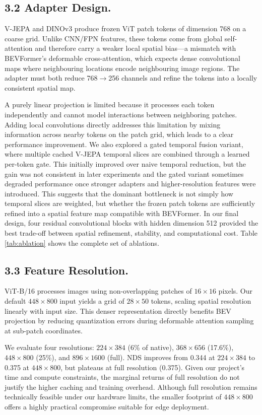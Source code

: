 \documentclass[12pt]{article}
\begin{document}
\subsection{3.2 Adapter Design.}
V-JEPA and DINOv3 produce frozen ViT patch tokens of dimension 768 on a coarse grid. Unlike CNN/FPN features, these tokens come from global self-attention and therefore carry a weaker local spatial bias---a mismatch with BEVFormer's deformable cross-attention, which expects dense convolutional maps where neighbouring locations encode neighbouring image regions. The adapter must both reduce 768$\to$256 channels and refine the tokens into a locally consistent spatial map.

A purely linear projection is limited because it processes each token independently and cannot model interactions between neighboring patches. Adding local convolutions directly addresses this limitation by mixing information across nearby tokens on the patch grid, which leads to a clear performance improvement. We also explored a gated temporal fusion variant, where multiple cached V-JEPA temporal slices are combined through a learned per-token gate. This initially improved over naive temporal reduction, but the gain was not consistent in later experiments and the gated variant sometimes degraded performance once stronger adapters and higher-resolution features were introduced. This suggests that the dominant bottleneck is not simply how temporal slices are weighted, but whether the frozen patch tokens are sufficiently refined into a spatial feature map compatible with BEVFormer. In our final design, four residual convolutional blocks with hidden dimension 512 provided the best trade-off between spatial refinement, stability, and computational cost. Table \ref{tab:ablation} shows the complete set of ablations.


\subsection{3.3 Feature Resolution.}
 
ViT-B/16 processes images using non-overlapping patches of $16 \times 16$ pixels. Our default $448 \times 800$ input yields a grid of $28 \times 50$ tokens, scaling spatial resolution linearly with input size. This denser representation directly benefits BEV projection by reducing quantization errors during deformable attention sampling at sub-patch coordinates.
 
We evaluate four resolutions: $224\times384$ (6\% of native), $368\times656$ (17.6\%), $448\times800$ (25\%), and $896\times1600$ (full). NDS improves from 0.344 at $224\times384$ to 0.375 at $448\times800$, but plateaus at full resolution (0.375). Given our project's time and compute constraints, the marginal returns of full resolution do not justify the higher caching and training overhead. Although full resolution remains technically feasible under our hardware limits, the smaller footprint of $448\times800$ offers a highly practical compromise suitable for edge deployment.
\end{document}
